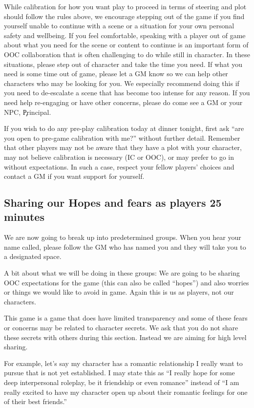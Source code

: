 \documentclass[green]{GL2020}
\begin{document}
While calibration for how you want play to proceed in terms of steering and plot should follow the rules above, we encourage stepping out of the game if you find yourself unable to continue with a scene or a situation for your own personal safety and wellbeing. If you feel comfortable, speaking with a player out of game about what you need for the scene or content to continue is an important form of OOC collaboration that is often challenging to do while still in character. In these situations, please step out of character and take the time you need. If what you need is some time out of game, please let a GM know so we can help other characters who may be looking for you. We especially recommend doing this if you need to de-escalate a scene that has become too intense for any reason. If you need help re-engaging or have other concerns, please do come see a GM or your NPC, \c{Principal}{}.

If you wish to do any pre-play calibration today at dinner tonight, first ask ``are you open to pre-game calibration with me?'' without further detail.  Remember that other players may not be aware that they have a plot with your character, may not believe calibration is necessary (IC or OOC), or may prefer to go in without expectations. In such a case, respect your fellow players' choices and contact a GM if you want support for yourself.

\subsection*{Sharing our Hopes and fears as players {25 minutes}}

We are now going to break up into predetermined groups. When you hear your name called, please follow the GM who has named you and they will take you to a designated space.  

A bit about what we will be doing in these groups: We are going to be sharing OOC expectations for the game (this can also be called “hopes”) and also worries or things we would like to avoid in game. Again this is us as players, not our characters.  

This game is a game that does have limited transparency and some of these fears or concerns may be related to character secrets.  We ask that you do not share these secrets with others during this section. Instead we are aiming for high level sharing.  

For example, let’s say my character has a romantic relationship I really want to pursue that is not yet established. I may state this as ``I really hope for some deep interpersonal roleplay, be it friendship or even romance''  instead of ``I am really excited to have my character open up about their romantic feelings for one of their best friends.'' 
\end{document}
